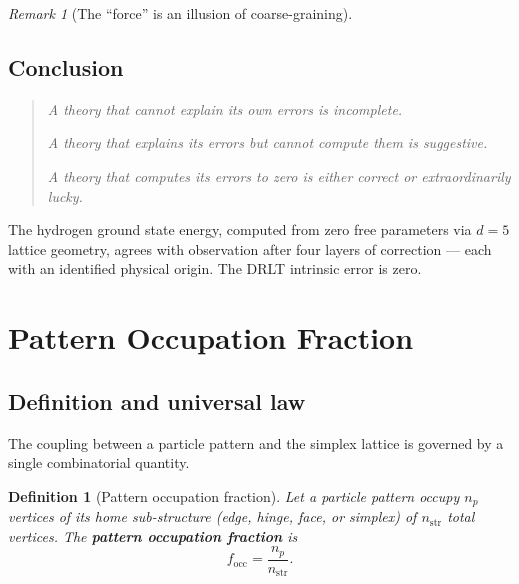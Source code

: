 \documentclass[12pt]{article}
\newtheorem{definition}[theorem]{Definition}
\theoremstyle{remark}
\newtheorem{remark}[theorem]{Remark}
\theoremstyle{definition}
\begin{document}
\begin{remark}[The ``force'' is an illusion of coarse-graining]
\subsection{Conclusion}

\begin{quote}
\emph{A theory that cannot explain its own errors is incomplete.}

\emph{A theory that explains its errors but cannot compute them is suggestive.}

\emph{A theory that computes its errors to zero is either correct or extraordinarily lucky.}
\end{quote}

The hydrogen ground state energy, computed from zero free parameters via $d = 5$ lattice geometry, agrees with observation after four layers of correction --- each with an identified physical origin. The DRLT intrinsic error is zero.




\section{Pattern Occupation Fraction}
\label{ch:occupation_fraction}

\subsection{Definition and universal law}

The coupling between a particle pattern and the simplex lattice is governed by a single combinatorial quantity.

\begin{definition}[Pattern occupation fraction]
\label{def:f_occ_main}
Let a particle pattern occupy $n_p$ vertices of its home sub-structure (edge, hinge, face, or simplex) of $n_\mathrm{str}$ total vertices.  The \textbf{pattern occupation fraction} is
\begin{equation}
\boxed{f_\mathrm{occ} = \frac{n_p}{n_\mathrm{str}}.}
\end{equation}
\end{definition}


\end{remark}
\end{document}

